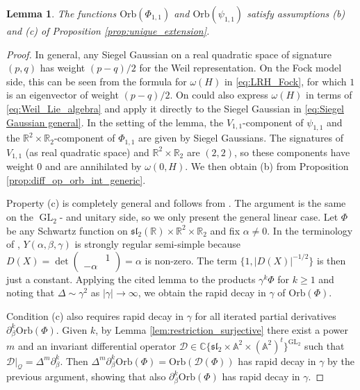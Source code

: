 \documentclass[reqno, 11pt]{amsart} %
\numberwithin{equation}{section}
\theoremstyle{plain}
\newtheorem{lemma}[theorem]{Lemma}
\theoremstyle{definition}
\theoremstyle{remark}
\newcommand{\mbA}{\mathbb{A}}
\newcommand{\mbC}{\mathbb{C}}
\newcommand{\mbR}{\mathbb{R}}
\newcommand{\mcD}{\mathcal{D}}
\newcommand{\mcQ}{\mathcal{Q}}
\newcommand{\mfl}{\mathfrak{l}}
\newcommand{\mfs}{\mathfrak{s}}
\newcommand{\mfsl}{\mfs\mfl}
\DeclareMathOperator{\GL}{GL}
\newcommand{\Orb}{\mathrm{Orb}}
\begin{document}
\begin{lemma}\label{lem:analytic_properties_simple}
The functions $\Orb(Φ_{1,1})$ and $\Orb(ψ_{1,1})$ satisfy assumptions (b) and (c) of Proposition \ref{prop:unique_extension}.
\end{lemma}
\begin{proof}
In general, any Siegel Gaussian on a real quadratic space of signature $(p,q)$ has weight $(p-q)/2$ for the Weil representation. On the Fock model side, this can be seen from the formula for $ω(H)$ in \eqref{eq:LRH_Fock}, for which $1$ is an eigenvector of weight $(p-q)/2$. On could also express $ω(H)$ in terms of \eqref{eq:Weil_Lie_algebra} and apply it directly to the Siegel Gaussian in \eqref{eq:Siegel Gaussian general}. In the setting of the lemma, the $V_{1,1}$-component of $ψ_{1,1}$ and the $\mbR^2\times \mbR_2$-component of $Φ_{1,1}$ are given by Siegel Gaussians. The signatures of $V_{1,1}$ (as real quadratic space) and $\mbR^2\times \mbR_2$ are $(2,2)$, so these components have weight $0$ and are annihilated by $ω(0,H)$. We then obtain (b) from Proposition \ref{prop:diff_op_orb_int_generic}.

Property (c) is completely general and follows from \cite[Lemma 5.5]{Xue}. The argument is the same on the $\GL_2$- and unitary side, so we only present the general linear case. Let $Φ$ be any Schwartz function on $\mfsl_2(\mbR)\times \mbR^2 \times \mbR_2$ and fix $α \neq 0$. In the terminology of \cite[Lemma 5.5]{Xue}, $Y(α, β, γ)$ is strongly regular semi-simple because $D(X) = \det\left(\begin{smallmatrix} & 1 \\ -α & \end{smallmatrix}\right) = α$ is non-zero. The term $\{1, |D(X)|^{-1/2}\}$ is then just a constant. Applying the cited lemma to the products $γ^kΦ$ for $k\geq 1$ and noting that $Δ\sim γ^2$ as $|γ|\to \infty$, we obtain the rapid decay in $γ$ of $\Orb(Φ)$.

Condition (c) also requires rapid decay in $γ$ for all iterated partial derivatives $\partial_β^k\Orb(Φ)$. Given $k$, by Lemma \ref{lem:restriction_surjective} there exist a power $m$ and an invariant differential operator $\mcD\in \mbC\{\mfsl_2\times \mbA^2\times (\mbA^2)^t\}^{\GL_2}$ such that $\mcD\vert_\mcQ = Δ^m\partial_β^k$. Then $Δ^m\partial_β^k \Orb(Φ) = \Orb(\mcD(Φ))$ has rapid decay in $γ$ by the previous argument, showing that also $\partial_β^k\Orb(Φ)$ has rapid decay in $γ$.
\end{proof}
\end{document}
